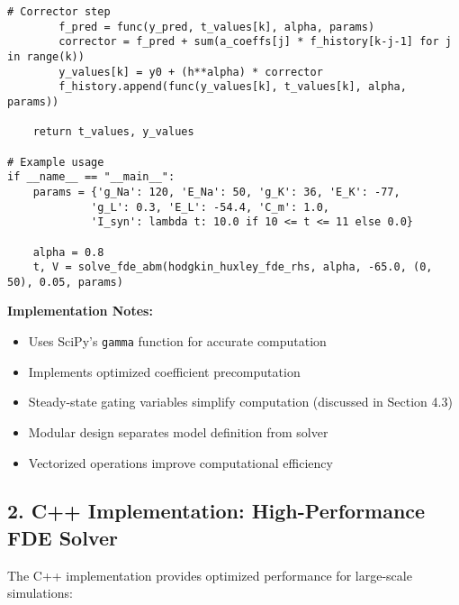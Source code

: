 \documentclass[a4paper,12pt]{article}
\begin{document}
\begin{lstlisting}[style=python, caption={Python implementation of ABM solver for FDEs}, label={lst:python-fde}]
        # Corrector step
        f_pred = func(y_pred, t_values[k], alpha, params)
        corrector = f_pred + sum(a_coeffs[j] * f_history[k-j-1] for j in range(k))
        y_values[k] = y0 + (h**alpha) * corrector
        f_history.append(func(y_values[k], t_values[k], alpha, params))
    
    return t_values, y_values

# Example usage
if __name__ == "__main__":
    params = {'g_Na': 120, 'E_Na': 50, 'g_K': 36, 'E_K': -77, 
             'g_L': 0.3, 'E_L': -54.4, 'C_m': 1.0,
             'I_syn': lambda t: 10.0 if 10 <= t <= 11 else 0.0}
    
    alpha = 0.8
    t, V = solve_fde_abm(hodgkin_huxley_fde_rhs, alpha, -65.0, (0, 50), 0.05, params)
\end{lstlisting}

\textbf{Implementation Notes:}
\begin{itemize}[leftmargin=*]
    \item Uses SciPy's \texttt{gamma} function for accurate computation
    \item Implements optimized coefficient precomputation
    \item Steady-state gating variables simplify computation (discussed in Section 4.3)
    \item Modular design separates model definition from solver
    \item Vectorized operations improve computational efficiency
\end{itemize}

\subsection*{2. C++ Implementation: High-Performance FDE Solver}

The C++ implementation provides optimized performance for large-scale simulations:
\end{document}
